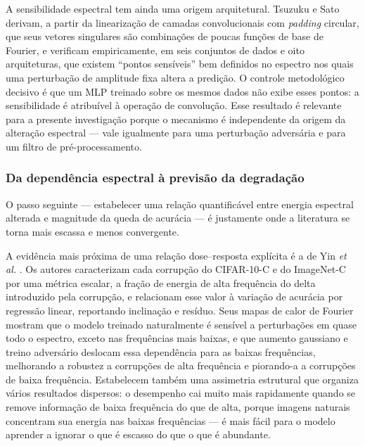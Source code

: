 \documentclass[conference]{IEEEtran}
\begin{document}
A sensibilidade espectral tem ainda uma origem arquitetural. Tsuzuku e Sato
\cite{b19} derivam, a partir da linearização de camadas convolucionais com
\textit{padding} circular, que seus vetores singulares são combinações de
poucas funções de base de Fourier, e verificam empiricamente, em seis conjuntos
de dados e oito arquiteturas, que existem ``pontos sensíveis'' bem definidos no
espectro nos quais uma perturbação de amplitude fixa altera a predição. O
controle metodológico decisivo é que um MLP treinado sobre os mesmos dados não
exibe esses pontos: a sensibilidade é atribuível à operação de convolução. Esse
resultado é relevante para a presente investigação porque o mecanismo é
independente da origem da alteração espectral --- vale igualmente para uma
perturbação adversária e para um filtro de pré-processamento.

\subsubsection{Da dependência espectral à previsão da degradação}

O passo seguinte --- estabelecer uma relação quantificável entre energia
espectral alterada e magnitude da queda de acurácia --- é justamente onde a
literatura se torna mais escassa e menos convergente.

A evidência mais próxima de uma relação dose--resposta explícita é a de Yin
\textit{et al.} \cite{b18}. Os autores caracterizam cada corrupção do
CIFAR-10-C e do ImageNet-C por uma métrica escalar, a fração de energia de alta
frequência do delta introduzido pela corrupção, e relacionam esse valor à
variação de acurácia por regressão linear, reportando inclinação e resíduo.
Seus mapas de calor de Fourier mostram que o modelo treinado naturalmente é
sensível a perturbações em quase todo o espectro, exceto nas frequências mais
baixas, e que aumento gaussiano e treino adversário deslocam essa dependência
para as baixas frequências, melhorando a robustez a corrupções de alta
frequência e piorando-a a corrupções de baixa frequência. Estabelecem também
uma assimetria estrutural que organiza vários resultados dispersos: o
desempenho cai muito mais rapidamente quando se remove informação de baixa
frequência do que de alta, porque imagens naturais concentram sua energia nas
baixas frequências --- é mais fácil para o modelo aprender a ignorar o que é
escasso do que o que é abundante.
\end{document}
